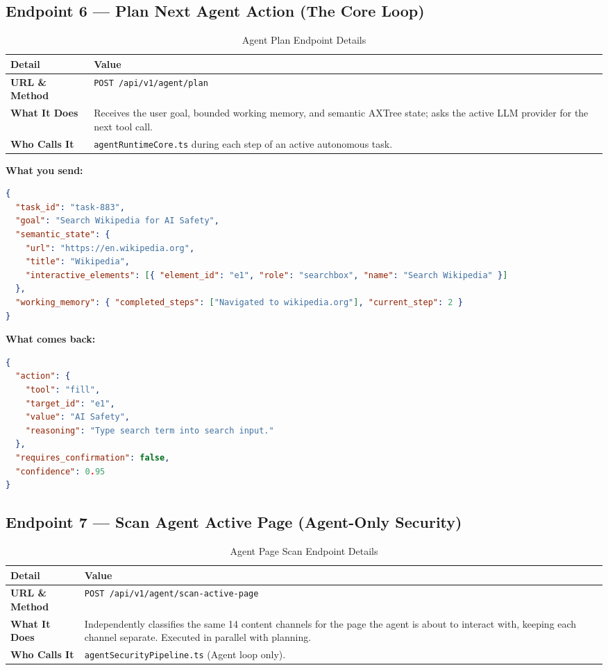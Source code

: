 \documentclass[11pt,a4paper]{article}
\begin{document}
\subsection{Endpoint 6 --- Plan Next Agent Action (The Core Loop)}
\begin{table}[H]
\centering
\small
\begin{tabularx}{\textwidth}{BX}
\toprule
\textbf{Detail} & \textbf{Value} \\
\midrule
\textbf{URL \& Method} & \texttt{POST /api/v1/agent/plan} \\
\textbf{What It Does} & Receives the user goal, bounded working memory, and semantic AXTree state; asks the active LLM provider for the next tool call. \\
\textbf{Who Calls It} & \texttt{agentRuntimeCore.ts} during each step of an active autonomous task. \\
\bottomrule
\end{tabularx}
\caption{Agent Plan Endpoint Details}
\end{table}

\textbf{What you send:}
\begin{lstlisting}[language=json]
{
  "task_id": "task-883",
  "goal": "Search Wikipedia for AI Safety",
  "semantic_state": {
    "url": "https://en.wikipedia.org",
    "title": "Wikipedia",
    "interactive_elements": [{ "element_id": "e1", "role": "searchbox", "name": "Search Wikipedia" }]
  },
  "working_memory": { "completed_steps": ["Navigated to wikipedia.org"], "current_step": 2 }
}
\end{lstlisting}

\textbf{What comes back:}
\begin{lstlisting}[language=json]
{
  "action": {
    "tool": "fill",
    "target_id": "e1",
    "value": "AI Safety",
    "reasoning": "Type search term into search input."
  },
  "requires_confirmation": false,
  "confidence": 0.95
}
\end{lstlisting}

\subsection{Endpoint 7 --- Scan Agent Active Page (Agent-Only Security)}
\begin{table}[H]
\centering
\small
\begin{tabularx}{\textwidth}{BX}
\toprule
\textbf{Detail} & \textbf{Value} \\
\midrule
\textbf{URL \& Method} & \texttt{POST /api/v1/agent/scan-active-page} \\
\textbf{What It Does} & Independently classifies the same 14 content channels for the page the agent is about to interact with, keeping each channel separate. Executed in parallel with planning. \\
\textbf{Who Calls It} & \texttt{agentSecurityPipeline.ts} (Agent loop only). \\
\bottomrule
\end{tabularx}
\caption{Agent Page Scan Endpoint Details}
\end{table}
\end{document}
